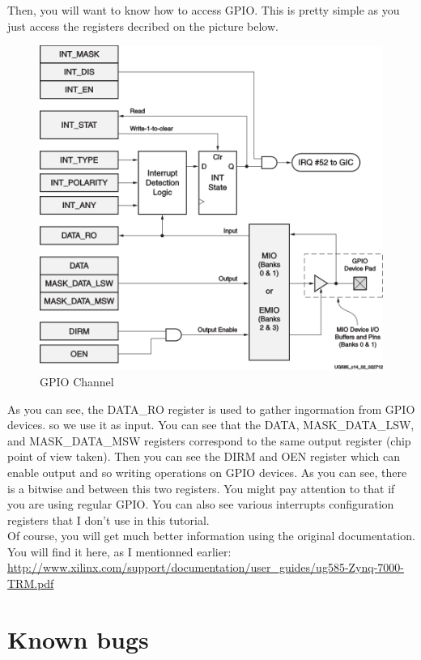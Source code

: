 \documentclass{article}
\begin{document}
\begin{appendices}
	Then, you will want to know how to access GPIO. This is pretty simple as you
	just access the registers decribed on the picture below.
	\begin{figure}[!h]
	\begin{center}
	\includegraphics[scale=0.7]{pictures/GPIOChannel.png}
	\end{center}
	\caption{GPIO Channel}
	\end{figure}
	As you can see, the DATA\_RO register is used to gather ingormation from
	GPIO devices. so we use it as input. You can see that the DATA,
	MASK\_DATA\_LSW, and MASK\_DATA\_MSW registers correspond to the same output
	register (chip point of view taken).
	Then you can see the DIRM and OEN register which can enable output and so
	writing operations on GPIO devices. As you can see, there is a bitwise and
	between this two registers. You might pay attention to that if you are using
	regular GPIO. You can also see various interrupts configuration registers
	that I don't use in this tutorial. \\


	Of course, you will get much better information using the original
	documentation. You will find it here, as I mentionned earlier:\\
		\url{http://www.xilinx.com/support/documentation/user\_guides/ug585-Zynq-7000-TRM.pdf}


\section{Known bugs}

\end{appendices}
\end{document}

